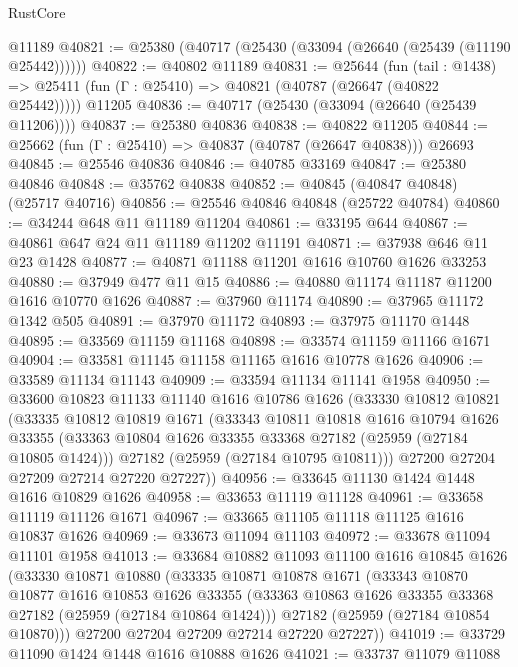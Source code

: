 \begin{lexlean}{RustCore}
\begin{coremodule}
    @11189
@40821 := @25380 (@40717 (@25430 (@33094 (@26640 (@25439 (@11190 @25442))))))
@40822 := @40802 @11189
@40831 := @25644
    (fun (tail : @1438) => @25411 (fun (Γ : @25410) => @40821 (@40787 (@26647 (@40822 @25442)))))
    @11205
@40836 := @40717 (@25430 (@33094 (@26640 (@25439 @11206))))
@40837 := @25380 @40836
@40838 := @40822 @11205
@40844 := @25662 (fun (Γ : @25410) => @40837 (@40787 (@26647 @40838))) @26693
@40845 := @25546 @40836
@40846 := @40785 @33169
@40847 := @25380 @40846
@40848 := @35762 @40838
@40852 := @40845 (@40847 @40848) (@25717 @40716)
@40856 := @25546 @40846 @40848 (@25722 @40784)
@40860 := @34244 @648 @11 @11189 @11204
@40861 := @33195 @644
@40867 := @40861 @647 @24 @11 @11189 @11202 @11191
@40871 := @37938 @646 @11 @23 @1428
@40877 := @40871 @11188 @11201 @1616 @10760 @1626 @33253
@40880 := @37949 @477 @11 @15
@40886 := @40880 @11174 @11187 @11200 @1616 @10770 @1626
@40887 := @37960 @11174
@40890 := @37965 @11172 @1342 @505
@40891 := @37970 @11172
@40893 := @37975 @11170 @1448
@40895 := @33569 @11159 @11168
@40898 := @33574 @11159 @11166 @1671
@40904 := @33581 @11145 @11158 @11165 @1616 @10778 @1626
@40906 := @33589 @11134 @11143
@40909 := @33594 @11134 @11141 @1958
@40950 := @33600
    @10823
    @11133
    @11140
    @1616
    @10786
    @1626
    (@33330
      @10812
      @10821
      (@33335
        @10812
        @10819
        @1671
        (@33343
          @10811
          @10818
          @1616
          @10794
          @1626
          @33355
          (@33363 @10804 @1626 @33355 @33368 @27182 (@25959 (@27184 @10805 @1424)))
          @27182
          (@25959 (@27184 @10795 @10811)))
        @27200
        @27204
        @27209
        @27214
        @27220
        @27227))
@40956 := @33645 @11130 @1424 @1448 @1616 @10829 @1626
@40958 := @33653 @11119 @11128
@40961 := @33658 @11119 @11126 @1671
@40967 := @33665 @11105 @11118 @11125 @1616 @10837 @1626
@40969 := @33673 @11094 @11103
@40972 := @33678 @11094 @11101 @1958
@41013 := @33684
    @10882
    @11093
    @11100
    @1616
    @10845
    @1626
    (@33330
      @10871
      @10880
      (@33335
        @10871
        @10878
        @1671
        (@33343
          @10870
          @10877
          @1616
          @10853
          @1626
          @33355
          (@33363 @10863 @1626 @33355 @33368 @27182 (@25959 (@27184 @10864 @1424)))
          @27182
          (@25959 (@27184 @10854 @10870)))
        @27200
        @27204
        @27209
        @27214
        @27220
        @27227))
@41019 := @33729 @11090 @1424 @1448 @1616 @10888 @1626
@41021 := @33737 @11079 @11088

\end{coremodule}
\end{lexlean}

